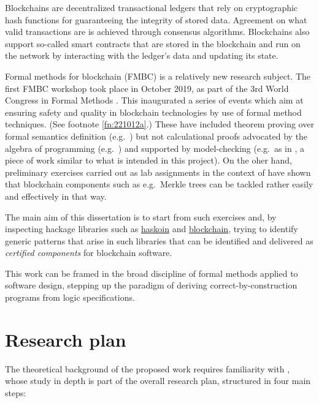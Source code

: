 \documentclass[a4paper, 11pt]{article} %
\begin{document}
Blockchains are decentralized transactional ledgers that rely on cryptographic
hash functions for guaranteeing the integrity of stored data. Agreement on
what valid transactions are is achieved through consensus algorithms. Blockchains
also support so-called smart contracts that are stored in the blockchain
and run on the network by interacting with the ledger’s data and updating
its state. 

Formal methods for blockchain (FMBC) is a relatively new research subject.
The first FMBC workshop took place in October 2019, as part of the 3rd World
Congress in Formal Methods \cite{DBLP:conf/fm/2019-w1}. This inaugurated
a series of events which aim at ensuring safety and quality in blockchain
technologies by use of formal method techniques. (See footnote \ref{fn:221012a}.)
These have included theorem proving over formal semantics definition
(e.g.\ \cite{DBLP:conf/cav/GabbayJS21})
but not calculational proofs advocated by the algebra of programming
(e.g.\ \cite{BM97}) and supported by model-checking (e.g.\ as in \cite{OF13},
a piece of work similar to what is intended in this project). On the oher
hand, preliminary exercises carried out as lab assignments in the context
of \cite{Ol05}
have shown that blockchain components such as e.g.\ Merkle trees \cite{DBLP:conf/crypto/Merkle87}
can be tackled rather easily and effectively in that way.

The main aim of this dissertation is to start from such exercises and,
by inspecting hackage libraries such as \href{https://hackage.haskell.org/package/haskoin-core}{haskoin}
and \href{https://hackage.haskell.org/package/blockchain}{blockchain}, trying
to identify generic patterns that arise in such libraries that can be identified
and delivered as \emph{certified components} for blockchain software.

This work can be framed in the broad discipline of formal methods applied to
software design, stepping up the paradigm of deriving correct-by-construction
programs from logic specifications.


\section*{Research plan}

The theoretical background of the proposed work requires familiarity with
\cite{BM97,Ol05}, whose study in depth is part of
the overall research plan, structured in four main steps:
\end{document}
